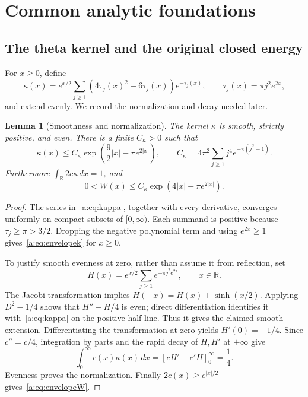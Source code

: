 \documentclass[11pt,a4paper]{article}
\numberwithin{equation}{section}
\newtheorem{lemma}[theorem]{Lemma}
\theoremstyle{definition}\newtheorem{definition}[theorem]{Definition}
\theoremstyle{remark}\newtheorem{remark}[theorem]{Remark}
\newcommand{\R}{\mathbb R}\newcommand{\C}{\mathbb C}\newcommand{\N}{\mathbb N}
\begin{document}
\section{Common analytic foundations}\label{sec:foundations}


\subsection{The theta kernel and the original closed energy}\label{a:sec:energy}

For $x\ge0$, define
\begin{equation}\label{a:eq:kappa}
 \kappa(x)=e^{x/2}\sum_{j\ge1}(4\tau_j(x)^2-6\tau_j(x))e^{-\tau_j(x)},
 \qquad \tau_j(x)=\pi j^2e^{2x},
\end{equation}
and extend evenly. We record the normalization and decay needed later.

\begin{lemma}[Smoothness and normalization]\label{a:lem:theta}
The kernel $\kappa$ is smooth, strictly positive, and even. There is a finite $C_\kappa>0$ such that
\begin{equation}\label{a:eq:envelopek}
 \kappa(x)\le C_\kappa\exp\!\left(\frac92|x|-\pi e^{2|x|}\right),
 \qquad
 C_\kappa=4\pi^2\sum_{j\ge1}j^4e^{-\pi(j^2-1)}.
\end{equation}
Furthermore $\int_\R2c\kappa\,dx=1$, and
\begin{equation}\label{a:eq:envelopeW}
 0<W(x)\le C_\kappa\exp(4|x|-\pi e^{2|x|}).
\end{equation}
\end{lemma}
\begin{proof}
The series in~\eqref{a:eq:kappa}, together with every derivative, converges uniformly on compact subsets of $[0,\infty)$. Each summand is positive because $\tau_j\ge\pi>3/2$. Dropping the negative polynomial term and using $e^{2x}\ge1$ gives~\eqref{a:eq:envelopek} for $x\ge0$.

To justify smooth evenness at zero, rather than assume it from reflection, set
\[
 H(x)=e^{x/2}\sum_{j\ge1}e^{-\pi j^2e^{2x}},\qquad x\in\R.
\]
The Jacobi transformation \cite[Eq.~20.7.32]{DLMF} implies
$H(-x)=H(x)+\sinh(x/2)$. Applying $D^2-1/4$ shows that $H''-H/4$ is even; direct differentiation identifies it with~\eqref{a:eq:kappa} on the positive half-line. Thus it gives the claimed smooth extension. Differentiating the transformation at zero yields $H'(0)=-1/4$. Since $c''=c/4$, integration by parts and the rapid decay of $H,H'$ at $+\infty$ give
\[
 \int_0^\infty c(x)\kappa(x)\,dx
  =[cH'-c'H]_0^\infty=\frac14.
\]
Evenness proves the normalization. Finally $2c(x)\ge e^{|x|/2}$ gives~\eqref{a:eq:envelopeW}.
\end{proof}
\end{document}
